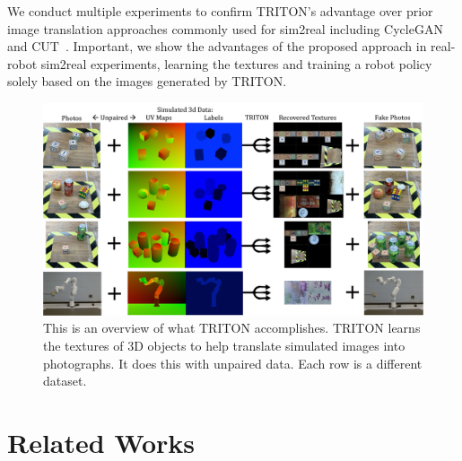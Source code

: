 \documentclass{article}
\begin{document}
We conduct multiple experiments to confirm TRITON's advantage over prior image translation approaches commonly used for sim2real including CycleGAN~\cite{cyclegan} and CUT~\cite{cut}.
Important, we show the advantages of the proposed approach in real-robot sim2real experiments, learning the textures and training a robot policy solely based on the images generated by TRITON. 

\begin{figure}[thbp]
	\vspace{-10pt}
	\begin{center}
		\includegraphics[width=\textwidth]{../images/first_diagram.pdf}
	\end{center}
	\vspace{-5pt}
	\caption{
		This is an overview of what TRITON accomplishes.
		TRITON learns the textures of 3D objects to help translate simulated images into photographs. It does this with unpaired data. Each row is a different dataset.
	}
	\label{fig:first_diagram}
	\vspace{-5pt}
\end{figure}
	
\vspace{-5pt}	
\section{Related Works}
\vspace{-3pt}
\end{document}
